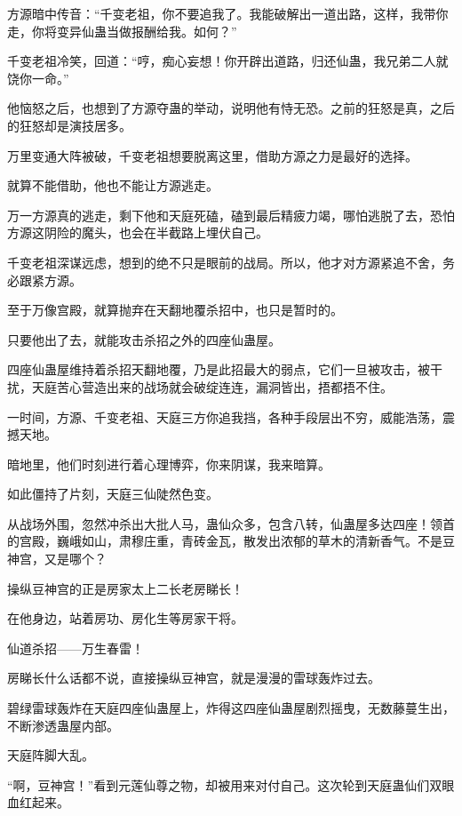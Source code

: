 
\begin{this_body}

方源暗中传音：“千变老祖，你不要追我了。我能破解出一道出路，这样，我带你走，你将变异仙蛊当做报酬给我。如何？”

千变老祖冷笑，回道：“哼，痴心妄想！你开辟出道路，归还仙蛊，我兄弟二人就饶你一命。”

他恼怒之后，也想到了方源夺蛊的举动，说明他有恃无恐。之前的狂怒是真，之后的狂怒却是演技居多。

万里变通大阵被破，千变老祖想要脱离这里，借助方源之力是最好的选择。

就算不能借助，他也不能让方源逃走。

万一方源真的逃走，剩下他和天庭死磕，磕到最后精疲力竭，哪怕逃脱了去，恐怕方源这阴险的魔头，也会在半截路上埋伏自己。

千变老祖深谋远虑，想到的绝不只是眼前的战局。所以，他才对方源紧追不舍，务必跟紧方源。

至于万像宫殿，就算抛弃在天翻地覆杀招中，也只是暂时的。

只要他出了去，就能攻击杀招之外的四座仙蛊屋。

四座仙蛊屋维持着杀招天翻地覆，乃是此招最大的弱点，它们一旦被攻击，被干扰，天庭苦心营造出来的战场就会破绽连连，漏洞皆出，捂都捂不住。

一时间，方源、千变老祖、天庭三方你追我挡，各种手段层出不穷，威能浩荡，震撼天地。

暗地里，他们时刻进行着心理博弈，你来阴谋，我来暗算。

如此僵持了片刻，天庭三仙陡然色变。

从战场外围，忽然冲杀出大批人马，蛊仙众多，包含八转，仙蛊屋多达四座！领首的宫殿，巍峨如山，肃穆庄重，青砖金瓦，散发出浓郁的草木的清新香气。不是豆神宫，又是哪个？

操纵豆神宫的正是房家太上二长老房睇长！

在他身边，站着房功、房化生等房家干将。

仙道杀招——万生春雷！

房睇长什么话都不说，直接操纵豆神宫，就是漫漫的雷球轰炸过去。

碧绿雷球轰炸在天庭四座仙蛊屋上，炸得这四座仙蛊屋剧烈摇曳，无数藤蔓生出，不断渗透蛊屋内部。

天庭阵脚大乱。

“啊，豆神宫！”看到元莲仙尊之物，却被用来对付自己。这次轮到天庭蛊仙们双眼血红起来。


\end{this_body}
